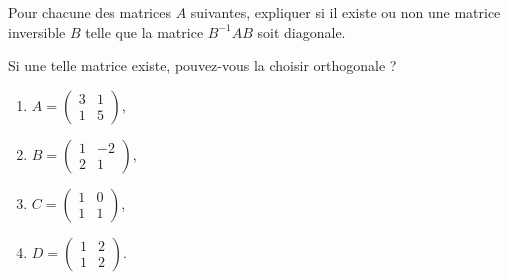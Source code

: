 

\begin{exercice}\label{exoINGE1121La0021}

	Pour chacune des matrices $A$ suivantes, expliquer si il existe ou non une matrice inversible $B$ telle que la matrice $B^{-1}AB$ soit diagonale. 
	
	Si une telle matrice existe, pouvez-vous la choisir orthogonale ?
	\begin{enumerate}

		\item
			$A=\begin{pmatrix}
				3	&	1	\\ 
				1	&	5	
			\end{pmatrix}$,
		\item
			$B=\begin{pmatrix}
				1	&	-2	\\ 
				2	&	1	
			\end{pmatrix}$,
		\item
			$C=\begin{pmatrix}
				1	&	0	\\ 
				1	&	1	
			\end{pmatrix}$,
		\item
			$D=\begin{pmatrix}
				1	&	2	\\ 
				1	&	2	
			\end{pmatrix}$.

	\end{enumerate}

\end{exercice}
